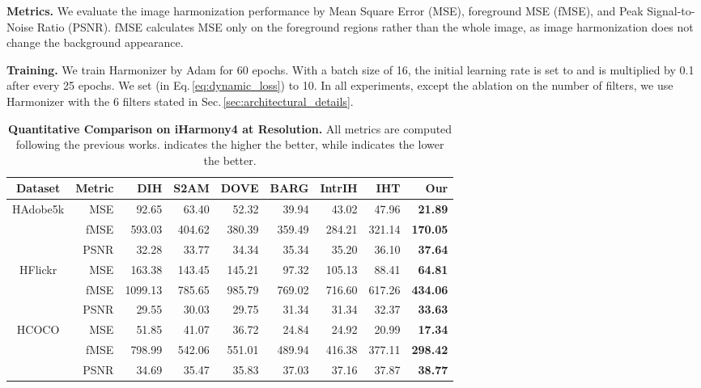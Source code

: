 \documentclass[runningheads]{llncs}
\begin{document}
\textbf{Metrics.} We evaluate the image harmonization performance by Mean Square Error (MSE), foreground MSE (fMSE), and Peak Signal-to-Noise Ratio (PSNR). 
fMSE calculates MSE only on the foreground regions rather than the whole image, as image harmonization does not change the background appearance. 

\textbf{Training.} We train Harmonizer by Adam for 60 epochs. With a batch size of 16, the initial learning rate is set to  and is multiplied by 0.1 after every 25 epochs. We set  (in Eq.\,\ref{eq:dynamic_loss}) to 10. In all experiments, except the ablation on the number of filters, we use Harmonizer with the 6 filters stated in Sec.\,\ref{sec:architectural_details}.



\begin{table*}[t]
  \begin{center}
    \caption{\textbf{Quantitative Comparison on iHarmony4 at  Resolution.} All metrics are computed following the previous works.  indicates the higher the better, while  indicates the lower the better.}\label{tab:lowresolution}
\setlength{\tabcolsep}{3pt}
\scriptsize
\begin{tabular}{c|r|rrrrrr|r}
\toprule
Dataset & Metric & DIH\cite{DIH} & S2AM\cite{S2AM} & DOVE\cite{DoveNet} & BARG\cite{BargainNet} & IntrIH\cite{IntrinsicIH} & IHT\cite{TransformerIH} & \;\;\;\;\;\;\;\;Our \\
\midrule
\multirow{3}{*}{HAdobe5k}
& MSE  &  92.65 &  63.40 &  52.32 &  39.94 &  43.02 &  47.96 &  \textbf{21.89} \\
& fMSE & 593.03 & 404.62 & 380.39 & 359.49 & 284.21 & 321.14 & \textbf{170.05} \\
& PSNR   &  32.28 &  33.77 &  34.34 &  35.34 &  35.20 &  36.10 &  \textbf{37.64} \\
\midrule
\multirow{3}{*}{HFlickr}
& MSE  & 163.38 & 143.45 & 145.21 &  97.32 & 105.13 &  88.41 &  \textbf{64.81} \\
& fMSE &1099.13 & 785.65 & 985.79 & 769.02 & 716.60 & 617.26 & \textbf{434.06} \\
& PSNR   &  29.55 &  30.03 &  29.75 &  31.34 &  31.34 &  32.37 &  \textbf{33.63} \\
\midrule
\multirow{3}{*}{HCOCO}
& MSE  &  51.85 &  41.07 &  36.72 &  24.84 &  24.92 &  20.99 &  \textbf{17.34} \\
& fMSE & 798.99 & 542.06 & 551.01 & 489.94 & 416.38 & 377.11 & \textbf{298.42} \\
& PSNR   &  34.69 &  35.47 &  35.83 &  37.03 &  37.16 &  37.87 &  \textbf{38.77} \\

\end{tabular}
\end{center}
\end{table*}
\end{document}
